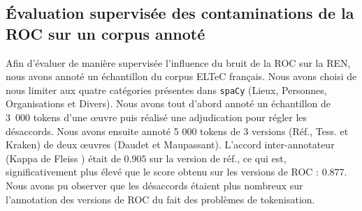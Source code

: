 


%    
%



\subsection{\'Evaluation supervisée des contaminations de la ROC sur un corpus annoté}
\label{subsec:eval_supervis_OCR-IMPACT-NER}
Afin d'évaluer de manière supervisée l'influence du bruit de la ROC sur la REN, nous avons annoté un échantillon du corpus ELTeC français.
 Nous avons choisi de nous limiter aux quatre catégories présentes dans \texttt{spaCy} (Lieux, Personnes, Organisations et Divers).
  Nous avons tout d'abord annoté un échantillon de 3~000 tokens d'une œuvre  puis réalisé une adjudication pour régler les désaccords. 
  Nous avons ensuite annoté 5 000 tokens de 3 versions (Réf., Tess. et Kraken) de deux œuvres (Daudet et Maupassant). %
L'accord inter-annotateur (Kappa de  Fleiss \cite{fleiss2013statistical}) était de $0.905$ sur la version de réf., ce qui est, significativement plus élevé que le score obtenu sur les versions de ROC : $0.877$.
 Nous avons pu observer que les désaccords étaient plus nombreux sur l'annotation des versions de ROC du fait des problèmes de tokenisation.

